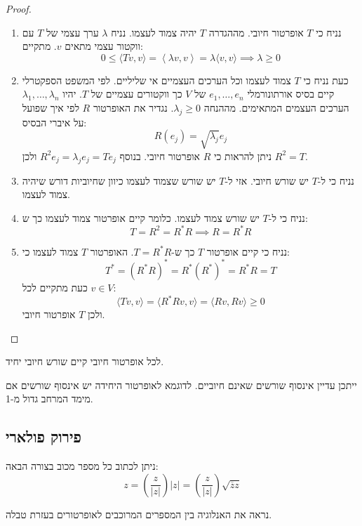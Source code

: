 \documentclass{tstextbook}
\begin{document}
\begin{proof}
  \begin{enumerate}
    \item נניח כי \(T\) אופרטור חיובי. מההגדרה \(T\) יהיה צמוד לעצמו. נניח \(\lambda\) ערך עצמי של \(T\) עם ווקטור עצמי מתאים \(v\). מתקיים: 
$$0\leq\langle Tv,v \rangle =\left\langle  \lambda v,v  \right\rangle =\lambda \langle v,v \rangle \implies \lambda \geq 0$$


    \item כעת נניח כי \(T\) צמוד לעצמו וכל הערכים העצמיים אי שליליים. לפי המשפט הספקטרלי קיים בסיס אורתונורמלי \(e_{1},\dots,e_{n}\) של \(V\) כך ווקטורים עצמיים של \(T\). יהיו \(\lambda_{1},\dots,\lambda_{n}\) הערכים העצמים המתאימים. מההנחה \(\lambda_{j}\geq 0\). נגדיר את האופרטור \(R\) לפי איך שפועל על איברי הבסיס: 
$$R (e_{j})=\sqrt{ \lambda_{j} }e_{j}$$
ניתן להראות כי \(R\) אופרטור חיובי. בנוסף \(R^{2}e_{j}=\lambda_{j}e_{j}=Te_{j}\) ולכן \(R^{2}=T\).


    \item נניח כי ל-\(T\) יש שורש חיובי. אזי ל-\(T\) יש שורש שצמוד לעצמו כיוון שחיוביות דורש שיהיה צמוד לעצמו. 


    \item נניח כי ל-\(T\) יש שורש צמוד לעצמו. כלומר קיים אופרטור צמוד לעצמו כך ש: 
$$T=R^{2}=R^{*}R\implies R=R ^{*}R$$


    \item נניח כי קיים אופרטור \(T\) כך ש-\(T=R^{*}R\). האופרטור \(T\) צמוד לעצמו כי: 
$$T^{*}=(R^{*}R)^{*}=R^{*}(R^{*})^{*}=R^{*}R=T$$
כעת מתקיים לכל \(v \in V\):
$$\langle Tv,v \rangle =\langle R^{*}Rv,v \rangle =\langle Rv,Rv \rangle \geq 0$$
ולכן \(T\) אופרטור חיובי.


  \end{enumerate}
\end{proof}
\begin{proposition}
לכל אופרטור חיובי קיים שורש חיובי יחיד.

\end{proposition}
\begin{remark}
ייתכן עדיין אינסוף שורשים שאינם חיוביים. לדוגמא לאופרטור היחידה יש אינסוף שורשים אם מימד המרחב גדול מ-1.

\end{remark}
\subsection{פירוק פולארי}

\begin{reminder}
ניתן לכתוב כל מספר מכוב בצורה הבאה:
$$z=\left( \frac{z}{\lvert z \rvert } \right)\lvert z \rvert = \left( \frac{z}{\lvert z \rvert } \right)\sqrt{ \overline{z} z }$$

\end{reminder}
נראה את האנלוגיה בין המספרים המרוכבים לאופרטורים בעזרת טבלה.
\end{document}
